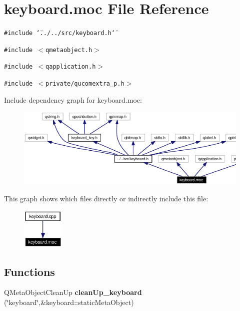 \section{keyboard.moc File Reference}
\label{keyboard_8moc}


{\tt \#include \char`\"{}../../src/keyboard.h\char`\"{}}\par
{\tt \#include $<$qmetaobject.h$>$}\par
{\tt \#include $<$qapplication.h$>$}\par
{\tt \#include $<$private/qucomextra\_\-p.h$>$}\par


Include dependency graph for keyboard.moc:\begin{figure}[H]
\begin{center}
\leavevmode
\includegraphics[width=352pt]{keyboard_8moc__incl}
\end{center}
\end{figure}


This graph shows which files directly or indirectly include this file:\begin{figure}[H]
\begin{center}
\leavevmode
\includegraphics[width=57pt]{keyboard_8moc__dep__incl}
\end{center}
\end{figure}
\subsection*{Functions}
\begin{CompactItemize}
\item 
QMeta\-Object\-Clean\-Up {\bf clean\-Up\_\-keyboard} (\char`\"{}keyboard\char`\"{},\&keyboard::static\-Meta\-Object)
\end{CompactItemize}


